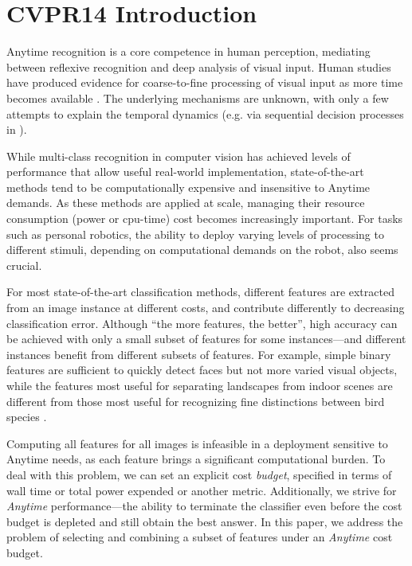 \section{CVPR14 Introduction}

Anytime recognition is a core competence in human perception, mediating between reflexive recognition and deep analysis of visual input.
Human studies have produced evidence for coarse-to-fine processing of visual input as more time becomes available \parencite{Vanrullen-1996,Fei-Fei-Vision-2007,Mace-PloS-2009}.
The underlying mechanisms are unknown, with only a few attempts to explain the temporal dynamics (e.g. via sequential decision processes in \textcite{Hegde-Neuro-2008}).

While multi-class recognition in computer vision has achieved levels of performance that allow useful real-world implementation, state-of-the-art methods tend to be computationally expensive and insensitive to Anytime demands.
As these methods are applied at scale, managing their resource consumption (power or cpu-time) cost becomes increasingly important.
For tasks such as personal robotics, the ability to deploy varying levels of processing to different stimuli, depending on computational demands on the robot, also seems crucial.

For most state-of-the-art classification methods, different features are extracted from an image instance at different costs, and contribute differently to decreasing classification error.
Although ``the more features, the better'', high accuracy can be achieved with only a small subset of features for some instances---and different instances benefit from different subsets of features.
For example, simple binary features are sufficient to quickly detect faces \parencite{Viola2004} but not more varied visual objects, while the features most useful for separating landscapes from indoor scenes \parencite{Xiao-CVPR-2010} are different from those most useful for recognizing fine distinctions between bird species \parencite{Farrell-ICCV-2011}.

Computing all features for all images is infeasible in a deployment sensitive to Anytime needs, as each feature brings a significant computational burden.
To deal with this problem, we can set an explicit cost \emph{budget}, specified in terms of wall time or total power expended or another metric.
Additionally, we strive for \emph{Anytime} performance---the ability to terminate the classifier even before the cost budget is depleted and still obtain the best answer.
In this paper, we address the problem of selecting and combining a subset of features under an \emph{Anytime} cost budget.

